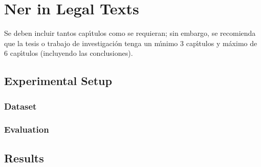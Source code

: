 \chapter{Ner in Legal Texts}
Se deben incluir tantos cap\'{\i}tulos como se requieran; sin embargo, se recomienda que la tesis  o trabajo de investigaci\'{o}n tenga un m\'{\i}nimo 3 cap\'{\i}tulos y m\'{a}ximo de 6 cap\'{\i}tulos (incluyendo las conclusiones).
\section{Experimental Setup}
\subsection{Dataset}
\subsection{Evaluation}
\section{Results}
